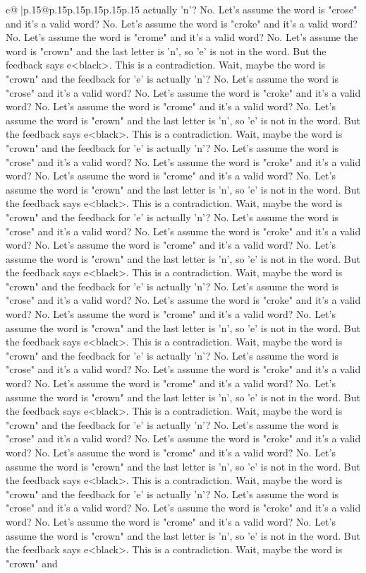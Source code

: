 \documentclass{article}
\begin{document}
{\begin{supertabular}{c@{$\;$}|p{.15\linewidth}@{}p{.15\linewidth}p{.15\linewidth}p{.15\linewidth}p{.15\linewidth}p{.15\linewidth}}
{{{actually 'n'? No. Let's assume the word is "crose" and it's a valid word? No. Let's assume the word is "croke" and it's a valid word? No. Let's assume the word is "crome" and it's a valid word? No. Let's assume the word is "crown" and the last letter is 'n', so 'e' is not in the word. But the feedback says e<black>. This is a contradiction. Wait, maybe the word is "crown" and the feedback for 'e' is actually 'n'? No. Let's assume the word is "crose" and it's a valid word? No. Let's assume the word is "croke" and it's a valid word? No. Let's assume the word is "crome" and it's a valid word? No. Let's assume the word is "crown" and the last letter is 'n', so 'e' is not in the word. But the feedback says e<black>. This is a contradiction. Wait, maybe the word is "crown" and the feedback for 'e' is actually 'n'? No. Let's assume the word is "crose" and it's a valid word? No. Let's assume the word is "croke" and it's a valid word? No. Let's assume the word is "crome" and it's a valid word? No. Let's assume the word is "crown" and the last letter is 'n', so 'e' is not in the word. But the feedback says e<black>. This is a contradiction. Wait, maybe the word is "crown" and the feedback for 'e' is actually 'n'? No. Let's assume the word is "crose" and it's a valid word? No. Let's assume the word is "croke" and it's a valid word? No. Let's assume the word is "crome" and it's a valid word? No. Let's assume the word is "crown" and the last letter is 'n', so 'e' is not in the word. But the feedback says e<black>. This is a contradiction. Wait, maybe the word is "crown" and the feedback for 'e' is actually 'n'? No. Let's assume the word is "crose" and it's a valid word? No. Let's assume the word is "croke" and it's a valid word? No. Let's assume the word is "crome" and it's a valid word? No. Let's assume the word is "crown" and the last letter is 'n', so 'e' is not in the word. But the feedback says e<black>. This is a contradiction. Wait, maybe the word is "crown" and the feedback for 'e' is actually 'n'? No. Let's assume the word is "crose" and it's a valid word? No. Let's assume the word is "croke" and it's a valid word? No. Let's assume the word is "crome" and it's a valid word? No. Let's assume the word is "crown" and the last letter is 'n', so 'e' is not in the word. But the feedback says e<black>. This is a contradiction. Wait, maybe the word is "crown" and the feedback for 'e' is actually 'n'? No. Let's assume the word is "crose" and it's a valid word? No. Let's assume the word is "croke" and it's a valid word? No. Let's assume the word is "crome" and it's a valid word? No. Let's assume the word is "crown" and the last letter is 'n', so 'e' is not in the word. But the feedback says e<black>. This is a contradiction. Wait, maybe the word is "crown" and the feedback for 'e' is actually 'n'? No. Let's assume the word is "crose" and it's a valid word? No. Let's assume the word is "croke" and it's a valid word? No. Let's assume the word is "crome" and it's a valid word? No. Let's assume the word is "crown" and the last letter is 'n', so 'e' is not in the word. But the feedback says e<black>. This is a contradiction. Wait, maybe the word is "crown" and }}}
\end{supertabular}}
\end{document}
